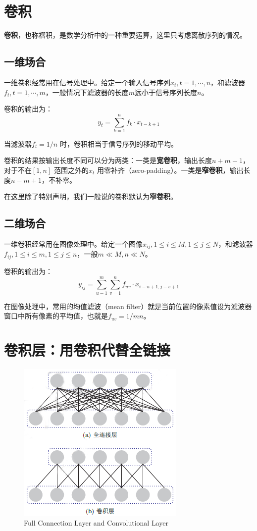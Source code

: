 \documentclass[11pt,fleqn, UTF8]{ctexbook} %
\begin{document}
\section{卷积}
\textbf{卷积}，也称褶积，是数学分析中的一种重要运算，这里只考虑离散序列的情况。

\subsection{一维场合}
一维卷积经常用在信号处理中。给定一个输入信号序列$x_t, t = 1,\cdots, n$，和滤波器$f_t, t = 1,\cdots,m$，一般情况下滤波器的长度$m$远小于信号序列长度$n$。

卷积的输出为：
\begin{equation}\label{6.1}
  y_t=\sum_{k=1}^n{f_k\cdot x_{t-k+1}}
\end{equation}

当滤波器$f_t=1/n$ 时，卷积相当于信号序列的移动平均。

卷积的结果按输出长度不同可以分为两类：一类是\textbf{宽卷积}，输出长度$n+m-1$，对于不在$[1,n]$ 范围之外的$x_t$ 用零补齐（zero-padding）。一类是\textbf{窄卷积}，输出长度$n-m+1$，不补零。

在这里除了特别声明，我们一般说的卷积默认为\textbf{窄卷积}。

\subsection{二维场合}
一维卷积经常用在图像处理中。给定一个图像$x_{ij}, 1 \leq i \leq M, 1 \leq j \leq N$，和滤波器$f_{ij}, 1 \leq i \leq m, 1 \leq j \leq n$，一般$m \ll M, n \ll N$。

卷积的输出为：
\begin{equation}\label{6.2}
  y_{ij}=\sum_{u-1}^m\sum_{v=1}^n{f_{uv}\cdot x_{i-u+1,j-v+1}}
\end{equation}

在图像处理中，常用的均值滤波（mean filter）就是当前位置的像素值设为滤波器窗口中所有像素的平均值，也就是$f_{uv} = 1/mn$。

\section{卷积层：用卷积代替全链接}
\begin{figure}[t]
 \centering
 \includegraphics{pics/61.png}
 \caption{Full Connection Layer and Convolutional Layer}
 \label{fig:6.1}
\end{figure}
\end{document}

